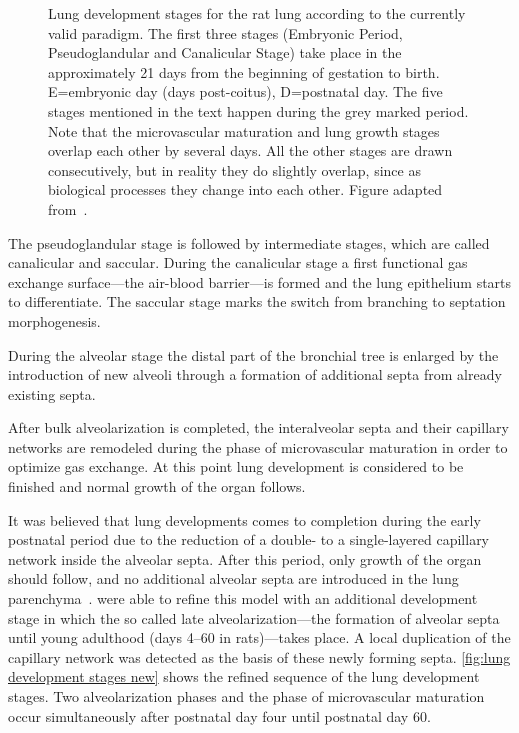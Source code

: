 \begin{figure}[htb]
	\noindent\makebox[\textwidth]{%
		\centering%
		}%
	\caption[Lung development stages]{Lung development stages for the rat lung according to the currently valid paradigm. The first three stages (Embryonic Period, Pseudoglandular and Canalicular Stage) take place in the approximately 21 days from the beginning of gestation to birth. E=embryonic day (days post-coitus), D=postnatal day. The five stages mentioned in the text happen during the grey marked period. Note that the microvascular maturation and lung growth stages overlap each other by several days. All the other stages are drawn consecutively, but in reality they do slightly overlap, since as biological processes they change into each other. Figure adapted from~\cite{Schittny2007a}.}
	\label{fig:lung development stages old}
\end{figure}

The pseudoglandular stage is followed by intermediate stages, which are called canalicular and saccular. During the canalicular stage a first functional gas exchange surface---the air-blood barrier---is formed and the lung epithelium starts to differentiate. The saccular stage marks the switch from branching to septation morphogenesis.

During the alveolar stage the distal part of the bronchial tree is enlarged by the introduction of new alveoli through a formation of additional septa from already existing septa. 

After bulk alveolarization is completed, the interalveolar septa and their capillary networks are remodeled during the phase of microvascular maturation in order to optimize gas exchange. At this point lung development is considered to be finished and normal growth of the organ follows.

It was believed that lung developments comes to completion during the early postnatal period due to the reduction of a double- to a single-layered capillary network inside the alveolar septa. After this period, only growth of the organ should follow, and no additional alveolar septa are introduced in the lung parenchyma~\cite{Burri1999,Schittny2004}. \citet{Schittny2008} were able to refine this model with an additional development stage in which the so called late alveolarization---the formation of alveolar septa until young adulthood (days 4--60 in rats)---takes place. A local duplication of the capillary network was detected as the basis of these newly forming septa. \autoref{fig:lung development stages new} shows the refined sequence of the lung development stages. Two alveolarization phases and the phase of microvascular maturation occur simultaneously after postnatal day four until postnatal day 60.

